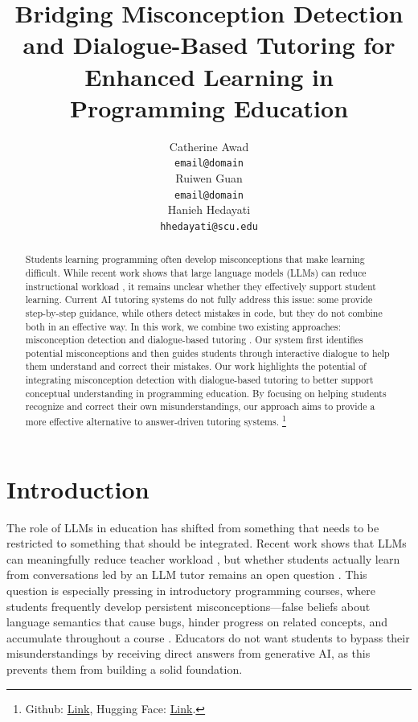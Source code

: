 \documentclass[11pt]{article}
\title{Bridging Misconception Detection and Dialogue-Based Tutoring for Enhanced Learning in Programming Education}
\author{Catherine Awad \\
  \texttt{email@domain} \\\And
  Ruiwen Guan \\
  \texttt{email@domain} \\\And
  Hanieh Hedayati \\
  \texttt{hhedayati@scu.edu}}
\begin{document}
\maketitle
\begin{abstract}
Students learning programming often develop misconceptions that make learning difficult. 
While recent work shows that large language models (LLMs) can reduce instructional workload 
\cite{tian-etal-2025-implementation}, it remains unclear whether they effectively support student 
learning. Current AI tutoring systems do not fully address this issue: some provide step-by-step guidance, while others detect mistakes in code, but they do not combine both in an effective way. 
In this work, we combine two existing approaches: misconception detection \cite{al-hossami-bunescu-2026-mcmining} and dialogue-based tutoring \cite{wang2025training}. Our system first identifies potential misconceptions and then guides students through interactive dialogue to help them understand and correct their mistakes. 
Our work highlights the potential of integrating misconception detection with dialogue-based tutoring to better support conceptual understanding in programming education. By focusing on helping students recognize and correct their own misunderstandings, our approach aims to provide a more effective alternative to answer-driven tutoring systems. \footnote{Github: \href{https://github.com/SCU-CSEN346/Tutor-Agents?tab=readme-ov-file}{Link}, Hugging Face: \href{https://huggingface.co/datasets/nlpscu/Tutor-Agents}{Link}.}
\end{abstract}


\section{Introduction}
The role of LLMs in education has shifted from something that needs to be restricted to something that should be integrated. Recent work shows that LLMs can meaningfully reduce teacher workload \cite{tian-etal-2025-implementation}, but whether students actually learn from conversations led by an LLM tutor remains an open question \cite{10.3389/bjbs.2024.14048}. This question is especially pressing in introductory programming courses, where students frequently develop persistent misconceptions—false beliefs about language semantics that cause bugs, hinder progress on related concepts, and accumulate throughout a course \cite{al-hossami-bunescu-2026-mcmining}. Educators do not want students to bypass their misunderstandings by receiving direct answers from generative AI, as this prevents them from building a solid foundation.
\end{document}
